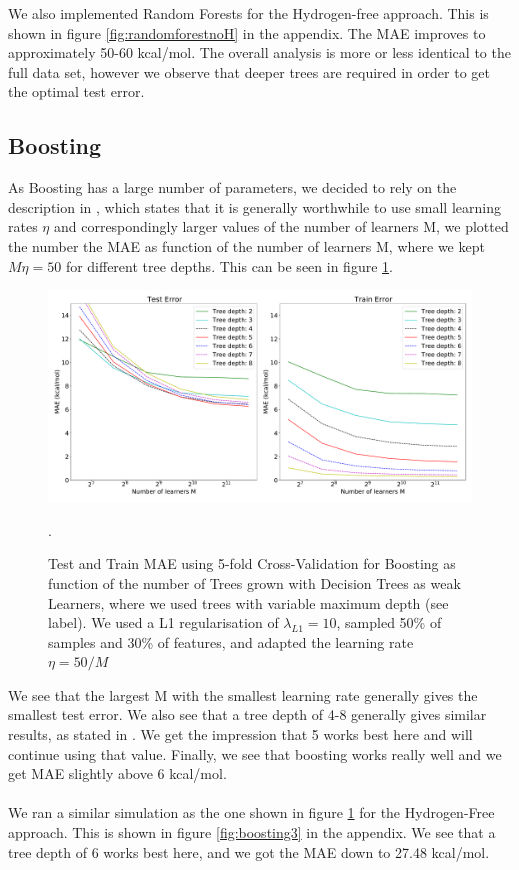 \documentclass[11pt,a4paper,notitlepage]{article}
\begin{document}
 We also implemented Random Forests for the Hydrogen-free approach. This is shown in figure \ref{fig:randomforestnoH} in the appendix. The MAE improves to approximately 50-60 kcal/mol. The overall analysis is more or less identical to the full data set, however we observe that deeper trees are required in order to get the optimal test error.

\subsection{Boosting}
As Boosting has a large number of parameters, we decided to rely on the description in \citep{hastie}, which states that it is generally worthwhile to use small learning rates $\eta$ and correspondingly larger values of the number of learners M, we plotted the number the MAE as function of the number of learners M, where we kept $M\eta=50$ for different tree depths. This can be seen in figure \ref{fig:boosting1}.
\begin{figure}[H]
\centering
\includegraphics[width=1\textwidth]{boosting1.pdf}
\caption[Boosting $M\eta=50$]{Test and Train MAE using 5-fold Cross-Validation for Boosting as function of the number of Trees grown with Decision Trees as weak Learners, where we used trees with variable maximum depth (see label). We used a L1 regularisation of $\lambda_{L1}=10$, sampled 50\% of samples and 30\% of features, and adapted the learning rate $\eta=50/M$} \label{fig:boosting1}.
\end{figure}
We see that the largest M with the smallest learning rate generally gives the smallest test error. We also see that a tree depth of 4-8 generally gives similar results, as stated in \citep{hastie}. We get the impression that 5 works best here and will continue using that value. Finally, we see that boosting works really well and we get MAE slightly above 6 kcal/mol.\\\\
We ran a similar simulation as the one shown in figure \ref{fig:boosting1} for the Hydrogen-Free approach. This is shown in figure \ref{fig:boosting3} in the appendix. We see that a tree depth of 6 works best here, and we  got the MAE down to 27.48 kcal/mol.
\end{document}
